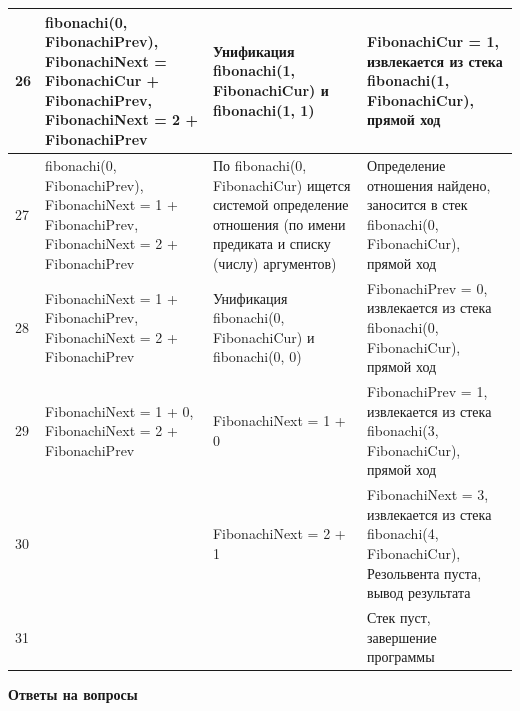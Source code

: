 \documentclass[a4paper,14pt]{extreport} %
\begin{document}
\begin{longtable}{|p{0.5cm}|p{5cm}|p{6cm}|p{5.5cm}|}
	26 & fibonachi(0, FibonachiPrev), FibonachiNext = FibonachiCur + FibonachiPrev, FibonachiNext = 2 + FibonachiPrev  & Унификация fibonachi(1, FibonachiCur) и fibonachi(1, 1) & FibonachiCur = 1, извлекается из стека fibonachi(1, FibonachiCur), прямой ход \\ \hline
	
	27 & fibonachi(0, FibonachiPrev), FibonachiNext = 1 + FibonachiPrev, FibonachiNext = 2 + FibonachiPrev  & По fibonachi(0, FibonachiCur) ищется системой определение отношения (по имени предиката и списку (числу) аргументов) & Определение отношения найдено, заносится в стек fibonachi(0, FibonachiCur), прямой ход \\ \hline

	28 & FibonachiNext = 1 + FibonachiPrev, FibonachiNext = 2 + FibonachiPrev  & Унификация fibonachi(0, FibonachiCur) и fibonachi(0, 0) & FibonachiPrev = 0, извлекается из стека fibonachi(0, FibonachiCur), прямой ход \\ \hline
	
	29 & FibonachiNext = 1 + 0, FibonachiNext = 2 + FibonachiPrev  & FibonachiNext = 1 + 0 & FibonachiPrev = 1, извлекается из стека fibonachi(3, FibonachiCur), прямой ход \\ \hline
	
	30 &  & FibonachiNext = 2 + 1  & FibonachiNext = 3, извлекается из стека fibonachi(4, FibonachiCur), Резольвента пуста, вывод результата \\ \hline
	
	31 &  &  & Стек пуст, завершение программы \\ \hline

\end{longtable}

\hfill

\textbf{Ответы на вопросы}
\end{document}
